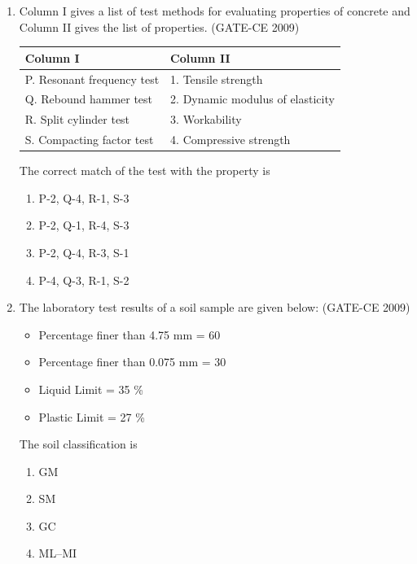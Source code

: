 \documentclass[12pt]{article}
\begin{document}
\begin{enumerate}[label=Q.\arabic*]
    \item Column I gives a list of test methods for evaluating properties of concrete and Column II gives the list of properties. (GATE-CE 2009)
    \begin{center}
    \begin{tabular}{|l|l|}
    \hline
    \textbf{Column I} & \textbf{Column II} \\
    \hline
    P. Resonant frequency test & 1. Tensile strength \\
    Q. Rebound hammer test & 2. Dynamic modulus of elasticity \\
    R. Split cylinder test & 3. Workability \\
    S. Compacting factor test & 4. Compressive strength \\
    \hline
    \end{tabular}
    \end{center}
    The correct match of the test with the property is
    \begin{enumerate}[label=(\Alph*)]
        \item P-2, Q-4, R-1, S-3 
        \item P-2, Q-1, R-4, S-3 
        \item P-2, Q-4, R-3, S-1 
        \item P-4, Q-3, R-1, S-2
    \end{enumerate}
    
    \item The laboratory test results of a soil sample are given below: (GATE-CE 2009)
    \begin{itemize}
        \item Percentage finer than 4.75 mm = 60
        \item Percentage finer than 0.075 mm = 30
        \item Liquid Limit = 35 \%
        \item Plastic Limit = 27 \%
    \end{itemize}
    The soil classification is
    \begin{enumerate}[label=(\Alph*)]
        \item GM 
        \item SM 
        \item GC 
        \item ML--MI
    \end{enumerate}
    

\end{enumerate}
\end{document}
